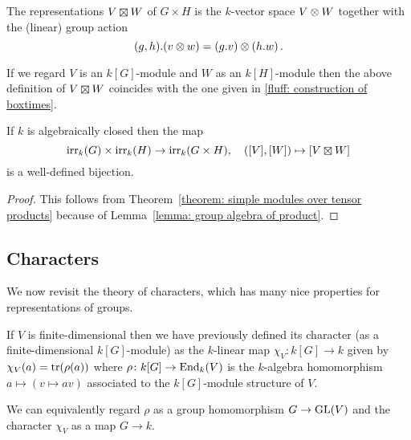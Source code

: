 \begin{definition}
  The representations $V \outertensor W$ of $G \times H$ is the $k$-vector space $V \mathbin{\otimes} W$ together with the (linear) group action
  \[
      (g,h).(v \mathbin{\otimes} w)
    = (g.v) \mathbin{\otimes} (h.w) \,.
  \]
\end{definition}


\begin{remark}
  If we regard $V$ is an $k[G]$-module and $W$ as an $k[H]$-module then the above definition of $V \outertensor W$ coincides with the one given in \ref{fluff: construction of boxtimes}.
\end{remark}


\begin{corollary}
  \label{corollary: irr rep of products}
  If $k$ is algebraically closed then the map
  \[
            \irr_k(G) \times \irr_k(H)
    \to     \irr_k(G \times H),
    \quad   ([V],[W])
    \mapsto [V \mathbin{\outertensor} W]
  \]
  is a well-defined bijection.
\end{corollary}


\begin{proof}
  This follows from Theorem~\ref{theorem: simple modules over tensor products} because of Lemma~\ref{lemma: group algebra of product}.
\end{proof}





\subsection{Characters}


\begin{fluff}
  We now revisit the theory of characters, which has many nice properties for representations of groups.
  
  If $V$ is finite-dimensional then we have previously defined its character (as a finite-dimensional $k[G]$-module) as the $k$-linear map $\chi_V \colon k[G] \to k$ given by $\chi_V(a) = \operatorname{tr}(\rho(a))$ where $\rho \colon k[G] \to \operatorname{End}_k(V)$ is the $k$-algebra homomorphism $a \mapsto (v \mapsto av)$ associated to the $k[G]$-module structure of $V$.
  
  We can equivalently regard $\rho$ as a group homomorphism $G \to \operatorname{GL}(V)$ and the character $\chi_V$ as a map $G \to k$.
\end{fluff}


